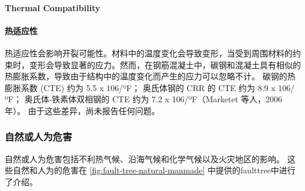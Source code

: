 \paragraph{Thermal Compatibility}
\paragraph{热适应性}
热适应性会影响开裂可能性。材料中的温度变化会导致变形，当受到周围材料的约束时，变形会导致显著的应力。然而，在钢筋混凝土中，碳钢和混凝土具有相似的热膨胀系数，导致由于结构中的温度变化而产生的应力可以忽略不计。 碳钢的热膨胀系数 (CTE) 约为 5.5 x 106/ºF； 奥氏体钢的 CRR 的 CTE 约为 8.9 x 106/ºF； 奥氏体-铁素体双相钢的 CTE 约为 7.2 x 106/ºF（Marketet 等人，2006 年）。 由于这些差异，尚未报告任何问题。

\subsubsection{自然或人为危害}
自然或人为危害包括不利热气候、沿海气候和化学气候以及火灾地区的影响。 这些自然和人为的危害在 \cref{fig:fault-tree-natural-manmade} 中提供的\gls*{faulttree}中进行了介绍。

